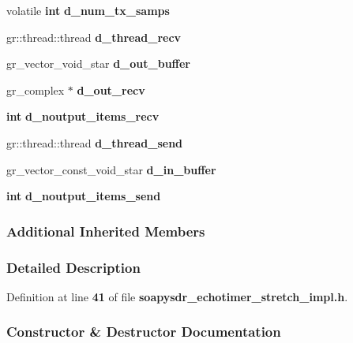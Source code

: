 \begin{DoxyCompactItemize}
\item 
volatile {\bf int} {\bf d\+\_\+num\+\_\+tx\+\_\+samps}
\item 
gr\+::thread\+::thread {\bf d\+\_\+thread\+\_\+recv}
\item 
gr\+\_\+vector\+\_\+void\+\_\+star {\bf d\+\_\+out\+\_\+buffer}
\item 
gr\+\_\+complex $\ast$ {\bf d\+\_\+out\+\_\+recv}
\item 
{\bf int} {\bf d\+\_\+noutput\+\_\+items\+\_\+recv}
\item 
gr\+::thread\+::thread {\bf d\+\_\+thread\+\_\+send}
\item 
gr\+\_\+vector\+\_\+const\+\_\+void\+\_\+star {\bf d\+\_\+in\+\_\+buffer}
\item 
{\bf int} {\bf d\+\_\+noutput\+\_\+items\+\_\+send}
\end{DoxyCompactItemize}
\subsubsection*{Additional Inherited Members}


\subsubsection{Detailed Description}


Definition at line {\bf 41} of file {\bf soapysdr\+\_\+echotimer\+\_\+stretch\+\_\+impl.\+h}.



\subsubsection{Constructor \& Destructor Documentation}
